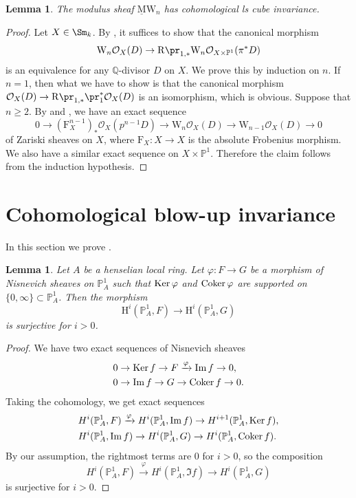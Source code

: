 \documentclass{amsart}
\theoremstyle{plain}
\newtheorem{lemma}[theorem]{Lemma}
\theoremstyle{definition}
\theoremstyle{remark}
\numberwithin{equation}{section}
\def\MW{\underline{\mathrm{M}}\mathrm{W}}
\begin{document}
\begin{lemma}\label{Witt_CCI}
	The modulus sheaf $\MW_n$ has cohomological ls cube invariance.
\end{lemma}

\begin{proof}
	Let $X\in \Sm_k$.
	By , it suffices to show that the canonical morphism
	$$
		\mathrm{W}_n\mathcal{O}_X(D)\to \mathrm{R}\pr_{1,*}\mathrm{W}_n\mathcal{O}_{X\times\mathbb{P}^1}(\pi^*D)
	$$
	is an equivalence for any $\mathbb{Q}$-divisor $D$ on $X$.
	We prove this by induction on $n$.
	If $n=1$, then what we have to show is that the canonical morphism
	$\mathcal{O}_X(D)\to \mathrm{R}\pr_{1,*}\pr_1^*\mathcal{O}_X(D)$
	is an isomorphism, which is obvious.
	Suppose that $n\geq 2$.
	By  and \cite[Proposition 3.7]{Tanaka_Witt}, we have an exact sequence
	$$
		0\to (\mathrm{F}^{n-1}_X)_*\mathcal{O}_X(p^{n-1}D)\to \mathrm{W}_n\mathcal{O}_X(D)\to \mathrm{W}_{n-1}\mathcal{O}_X(D)\to 0
	$$
	of Zariski sheaves on $X$, where $\mathrm{F}_X\colon X\to X$ is the absolute Frobenius morphism.
	We also have a similar exact sequence on $X\times\mathbb{P}^1$.
	Therefore the claim follows from the induction hypothesis.
\end{proof}






\section{Cohomological blow-up invariance}\label{section_main}



In this section we prove .

\begin{lemma}\label{P1_vanishing_lemma}
	Let $A$ be a henselian local ring.
	Let $\varphi\colon F\to G$ be a morphism of Nisnevich sheaves on $\mathbb{P}^1_A$ such that $\operatorname{Ker} \varphi$ and $\operatorname{Coker} \varphi$ are supported on $\{0,\infty\}\subset\mathbb{P}^1_A$.
	Then the morphism
	$$
		\mathrm{H}^i(\mathbb{P}^1_A, F)\to \mathrm{H}^i(\mathbb{P}^1_A, G)
	$$
	is surjective for $i>0$.
\end{lemma}

\begin{proof}
	We have two exact sequences of Nisnevich sheaves
	\begin{align*}
		&0\to \operatorname{Ker} f\to F\xrightarrow{\varphi} \operatorname{Im} f\to 0,\\
		&0\to \operatorname{Im} f\to G\to \operatorname{Coker} f\to 0.
	\end{align*}
	Taking the cohomology, we get exact sequences
	\begin{align*}
		&H^i(\mathbb{P}^1_A,F)\xrightarrow{\varphi} H^i(\mathbb{P}^1_A,\operatorname{Im} f)\to H^{i+1}(\mathbb{P}^1_A,\operatorname{Ker} f),\\
		&H^i(\mathbb{P}^1_A,\operatorname{Im} f)\to H^i(\mathbb{P}^1_A,G)\to H^i(\mathbb{P}^1_A,\operatorname{Coker} f).
	\end{align*}
	By our assumption, the rightmost terms are $0$ for $i>0$, so the composition
	$$
		H^i(\mathbb{P}^1_A,F)\xrightarrow{\varphi} H^i(\mathbb{P}^1_A,\Im f)\to H^i(\mathbb{P}^1_A,G)
	$$
	is surjective for $i>0$.
\end{proof}
\end{document}
